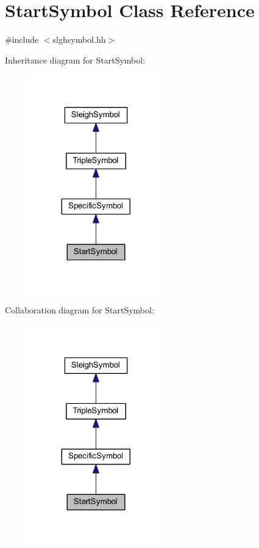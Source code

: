 \hypertarget{class_start_symbol}{}\section{Start\+Symbol Class Reference}
\label{class_start_symbol}


{\ttfamily \#include $<$slghsymbol.\+hh$>$}



Inheritance diagram for Start\+Symbol\+:
\nopagebreak
\begin{figure}[H]
\begin{center}
\leavevmode
\includegraphics[width=164pt]{class_start_symbol__inherit__graph}
\end{center}
\end{figure}


Collaboration diagram for Start\+Symbol\+:
\nopagebreak
\begin{figure}[H]
\begin{center}
\leavevmode
\includegraphics[width=164pt]{class_start_symbol__coll__graph}
\end{center}
\end{figure}
